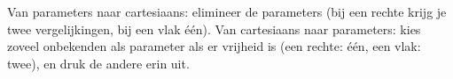 \begin{werkwijze}
Van parameters naar cartesiaans: elimineer de parameters (bij een rechte krijg je twee vergelijkingen, bij een vlak één). Van cartesiaans naar parameters: kies zoveel onbekenden als parameter als er vrijheid is (een rechte: één, een vlak: twee), en druk de andere erin uit.
\end{werkwijze}

\begin{oefeningen}

\end{oefeningen}

\opdrachtenkop

\begin{oefeningen}


























\end{oefeningen}

